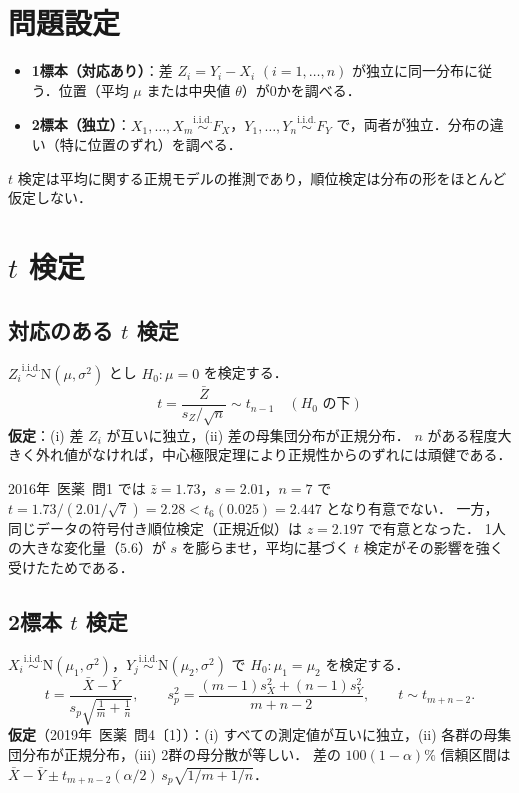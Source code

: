 \documentclass[a4paper,11pt,openany]{ltjsbook}
\newcommand{\kakomon}[2]{\mbox{#1年 医薬 問#2}}
\newcommand{\iid}{\overset{\text{i.i.d.}}{\sim}}
\newcommand{\Normal}{\mathrm{N}}
\begin{document}
\section{問題設定}\label{sec:03-setting}
\begin{itemize}
\item \textbf{1標本（対応あり）}：差 $Z_i=Y_i-X_i$ $(i=1,\dots,n)$ が独立に同一分布に従う．位置（平均 $\mu$ または中央値 $\theta$）が0かを調べる．
\item \textbf{2標本（独立）}：$X_1,\dots,X_m\iid F_X$，$Y_1,\dots,Y_n\iid F_Y$ で，両者が独立．分布の違い（特に位置のずれ）を調べる．
\end{itemize}
$t$ 検定は平均に関する正規モデルの推測であり，順位検定は分布の形をほとんど仮定しない．

\section{\texorpdfstring{$t$}{t} 検定}\label{sec:03-t}
\subsection{対応のある \texorpdfstring{$t$}{t} 検定}\label{subsec:03-pairedt}
$Z_i\iid\Normal(\mu,\sigma^2)$ とし $H_0:\mu=0$ を検定する．
\begin{equation}
t=\frac{\bar Z}{s_Z/\sqrt n}\sim t_{n-1}\quad(H_0\text{ の下})\label{eq:03-pairedt}
\end{equation}
\textbf{仮定}：(i) 差 $Z_i$ が互いに独立，(ii) 差の母集団分布が正規分布．
$n$ がある程度大きく外れ値がなければ，中心極限定理により正規性からのずれには頑健である．

\kakomon{2016}{1} では $\bar z=1.73$，$s=2.01$，$n=7$ で $t=1.73/(2.01/\sqrt7)=2.28<t_6(0.025)=2.447$ となり有意でない．
一方，同じデータの符号付き順位検定（正規近似）は $z=2.197$ で有意となった．
1人の大きな変化量（$5.6$）が $s$ を膨らませ，平均に基づく $t$ 検定がその影響を強く受けたためである．

\subsection{2標本 \texorpdfstring{$t$}{t} 検定}\label{subsec:03-twot}
$X_i\iid\Normal(\mu_1,\sigma^2)$，$Y_j\iid\Normal(\mu_2,\sigma^2)$ で $H_0:\mu_1=\mu_2$ を検定する．
\begin{equation}
t=\frac{\bar X-\bar Y}{s_p\sqrt{\frac1m+\frac1n}},\qquad s_p^2=\frac{(m-1)s_X^2+(n-1)s_Y^2}{m+n-2},\qquad t\sim t_{m+n-2}.\label{eq:03-twot}
\end{equation}
\textbf{仮定}（\kakomon{2019}{4}〔1〕）：(i) すべての測定値が互いに独立，(ii) 各群の母集団分布が正規分布，(iii) 2群の母分散が等しい．
差の $100(1-\alpha)\%$ 信頼区間は $\bar X-\bar Y\pm t_{m+n-2}(\alpha/2)\,s_p\sqrt{1/m+1/n}$．
\end{document}
